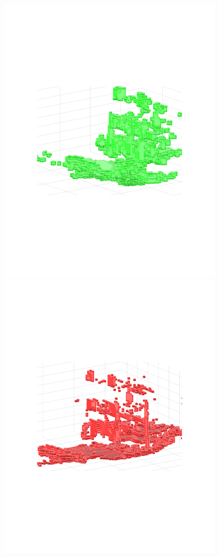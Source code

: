 \documentclass{UCF_ETD}
\begin{document}
\begin{figure}[H] 
\begin{center}
\includegraphics[scale=0.38]{RobustRegistration/Scan12CloseUpRegistered}
\includegraphics[scale=0.38]{RobustRegistration/Scan13CloseUpFixed}

\end{center}
\end{figure}
\end{document}
